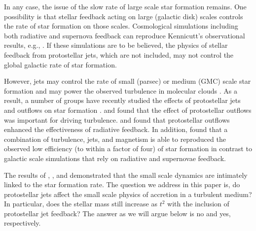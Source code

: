 \documentclass[../dissertation.tex]{subfiles}
\begin{document}
In any case, the issue of the slow rate of large scale star formation remains.
One possibility is that stellar feedback acting on large (galactic disk) scales controls the rate of star formation on those scales.
Cosmological simulations including both radiative and supernova feedback can reproduce Kennicutt's observational results, e.g., \cite{2011MNRAS.417..950H,2013ApJ...770...25A,2014MNRAS.445..581H}. If these simulations are to be believed, the physics of stellar feedback from protostellar jets, which are not included, may not control the global galactic rate of star formation.

However, jets may control the rate of small (parsec) or medium (GMC) scale star formation and may power the observed turbulence in molecular clouds \citep{2007ApJ...659.1394M}.
As a result, a number of groups have recently studied the effects of protostellar jets and outflows on star formation \citep{2010ApJ...709...27W,2014MNRAS.439.3420M,2015MNRAS.450.4035F}.
\citet{2007ApJ...662..395N} and \citet{2011ApJ...740...36N} found that the effect of protostellar outflows was important for driving turbulence.  \citet{2011ApJ...740..107C} and \citet{2012ApJ...747...22H} found that protostellar outflows enhanced the effectiveness of radiative feedback.  In addition, \citet{2015MNRAS.450.4035F} found that a combination of turbulence, jets, and magnetism is able to reproduced the observed low efficiency (to within a factor of four) of star formation in contrast to galactic scale simulations that rely on radiative and supernovae feedback.


The results of \citet{2015ApJ...800...49L}, \citet{2015ApJ...804...44M}, and \citet{2017MNRAS.465.1316M} demonstrated that the small scale dynamics are intimately linked to the star formation rate. The question we address in this paper is, do protostellar jets affect the small scale physics of accretion in a turbulent medium?  In particular, does the stellar mass still increase as $t^2$ with the inclusion of protostellar jet feedback?  The answer as we will argue below is no and yes, respectively.
\end{document}
